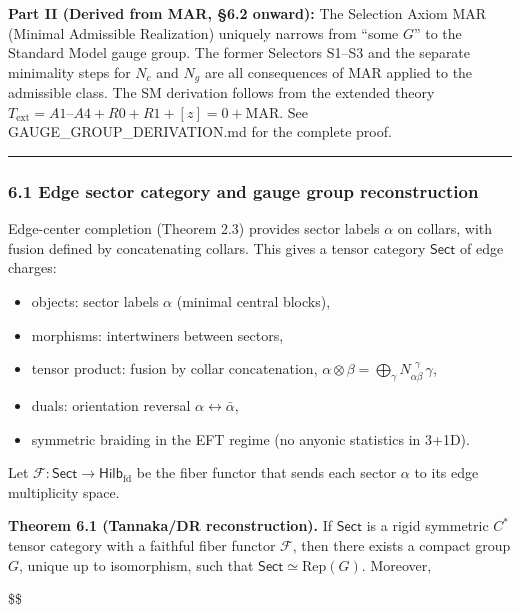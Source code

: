 \documentclass[11pt,a4paper]{article}
\theoremstyle{remark}
\providecommand{\tightlist}{%
  \setlength{\itemsep}{0pt}\setlength{\parskip}{0pt}}
\begin{document}
\textbf{Part II (Derived from MAR, §6.2 onward):} The Selection Axiom MAR
(Minimal Admissible Realization) uniquely narrows from ``some \(G\)'' to the
Standard Model gauge group. The former Selectors S1--S3 and the separate
minimality steps for \(N_c\) and \(N_g\) are all consequences of MAR applied to
the admissible class. The SM derivation follows from the extended theory
\(T_{\mathrm{ext}} = A1\text{–}A4 + R0 + R1 + [z]=0 + \mathrm{MAR}\).
See GAUGE\_GROUP\_DERIVATION.md for the complete proof.

\begin{center}\rule{0.5\linewidth}{0.5pt}\end{center}

\subsubsection{6.1 Edge sector category and gauge group reconstruction}\label{edge-sector-category-and-gauge-group-reconstruction}

Edge-center completion (Theorem 2.3) provides sector labels \(\alpha\) on collars,
with fusion defined by concatenating collars. This gives a tensor category
\(\mathsf{Sect}\) of edge charges:

\begin{itemize}
\tightlist
\item
  objects: sector labels \(\alpha\) (minimal central blocks),
\item
  morphisms: intertwiners between sectors,
\item
  tensor product: fusion by collar concatenation, \(\alpha \otimes \beta = \bigoplus_\gamma N_{\alpha\beta}^{\ \ \gamma}\,\gamma\),
\item
  duals: orientation reversal \(\alpha \leftrightarrow \bar\alpha\),
\item
  symmetric braiding in the EFT regime (no anyonic statistics in 3+1D).
\end{itemize}

Let \(\mathcal F: \mathsf{Sect} \to \mathsf{Hilb}_{\mathrm{fd}}\) be the fiber functor
that sends each sector \(\alpha\) to its edge multiplicity space.

\textbf{Theorem 6.1 (Tannaka/DR reconstruction).} If \(\mathsf{Sect}\) is a rigid
symmetric \(C^*\) tensor category with a faithful fiber functor \(\mathcal F\),
then there exists a compact group \(G\), unique up to isomorphism, such that
\(\mathsf{Sect} \simeq \mathrm{Rep}(G)\). Moreover,

\$\$
\end{document}
